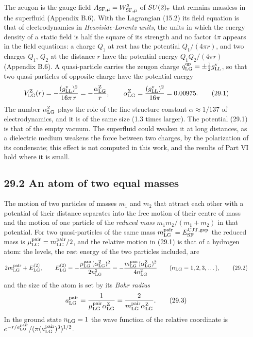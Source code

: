 \documentclass[
  10pt,
]{article}
\begin{document}
The zeugon is the gauge field \(A_{{\rm SF},\mu}=W^3_{{\rm SF},\mu}\) of
\(SU(2)_{\rm v}\) that remains massless in the superfluid (Appendix
B.6). With the Lagrangian (15.2) its field equation is that of
electrodynamics in \emph{Heaviside-Lorentz units}, the units in which
the energy density of a static field is half the square of its strength
and no factor \(4\pi\) appears in the field equations: a charge \(Q_1\)
at rest has the potential \(Q_1/(4\pi r)\), and two charges \(Q_1\),
\(Q_2\) at the distance \(r\) have the potential energy
\(Q_1Q_2/(4\pi r)\) (Appendix B.6). A quasi-particle carries the zeugon
charge \(q^{\rm qp}_{\rm LG}=\pm\tfrac12g^{\rm v}_{\rm LL}\), so that
two quasi-particles of opposite charge have the potential energy
\[V^{\rm Z}_{\rm LG}(r)=-\frac{(g^{\rm v}_{\rm LL})^2}{16\pi\,r}=-\frac{\alpha^{\rm Z}_{\rm LG}}r,\qquad\alpha^{\rm Z}_{\rm LG}=\frac{(g^{\rm v}_{\rm LL})^2}{16\pi}=0.00975.\tag{29.1}\]
The number \(\alpha^{\rm Z}_{\rm LG}\) plays the role of the
fine-structure constant \(\alpha\approx1/137\) of electrodynamics, and
it is of the same size (1.3 times larger). The potential (29.1) is that
of the empty vacuum. The superfluid could weaken it at long distances,
as a dielectric medium weakens the force between two charges, by the
polarization of its condensate; this effect is not computed in this
work, and the results of Part VI hold where it is small.

\hypertarget{an-atom-of-two-equal-masses}{%
\subsection{29.2 An atom of two equal
masses}\label{an-atom-of-two-equal-masses}}

The motion of two particles of masses \(m_1\) and \(m_2\) that attract
each other with a potential of their distance separates into the free
motion of their centre of mass and the motion of one particle of the
\emph{reduced mass} \(m_1m_2/(m_1+m_2)\) in that potential. For two
quasi-particles of the same mass
\(m^{\rm pair}_{\rm LG}=E^{\rm CJT,gap}_{\rm SF}\) the reduced mass is
\(\mu^{\rm pair}_{\rm LG}=m^{\rm pair}_{\rm LG}/2\), and the relative
motion in (29.1) is that of a hydrogen atom: the levels, the rest energy
of the two particles included, are
\[2m^{\rm pair}_{\rm LG}+E^{(2)}_{\rm LG},\qquad E^{(2)}_{\rm LG}=-\frac{\mu^{\rm pair}_{\rm LG}(\alpha^{\rm Z}_{\rm LG})^2}{2n_{\rm LG}^2}=-\frac{m^{\rm pair}_{\rm LG}(\alpha^{\rm Z}_{\rm LG})^2}{4n_{\rm LG}^2}\qquad(n_{\rm LG}=1,2,3,\dots),\tag{29.2}\]
and the size of the atom is set by its \emph{Bohr radius}
\[a^{\rm pair}_{\rm LG}=\frac1{\mu^{\rm pair}_{\rm LG}\alpha^{\rm Z}_{\rm LG}}=\frac2{m^{\rm pair}_{\rm LG}\alpha^{\rm Z}_{\rm LG}}.\tag{29.3}\]
In the ground state \(n_{\rm LG}=1\) the wave function of the relative
coordinate is
\(e^{-r/a^{\rm pair}_{\rm LG}}/(\pi(a^{\rm pair}_{\rm LG})^3)^{1/2}\).
\end{document}
